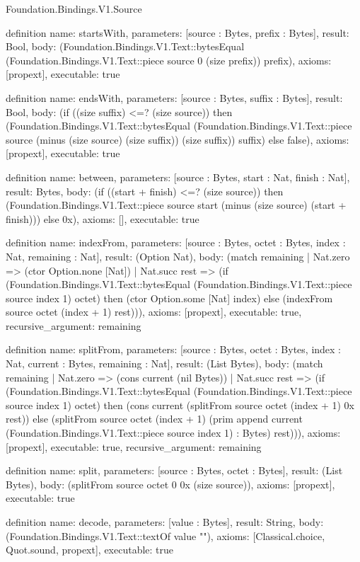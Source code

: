 \begin{lexlean}{Foundation.Bindings.V1.Source}
\begin{semanticmodule}
definition{
  name: startsWith,
  parameters: [source : Bytes, prefix : Bytes],
  result: Bool,
  body: (Foundation.Bindings.V1.Text::bytesEqual (Foundation.Bindings.V1.Text::piece source 0 (size prefix)) prefix),
  axioms: [propext],
  executable: true
}

definition{
  name: endsWith,
  parameters: [source : Bytes, suffix : Bytes],
  result: Bool,
  body: (if ((size suffix) <=? (size source)) then (Foundation.Bindings.V1.Text::bytesEqual (Foundation.Bindings.V1.Text::piece source (minus (size source) (size suffix)) (size suffix)) suffix) else false),
  axioms: [propext],
  executable: true
}

definition{
  name: between,
  parameters: [source : Bytes, start : Nat, finish : Nat],
  result: Bytes,
  body: (if ((start + finish) <=? (size source)) then (Foundation.Bindings.V1.Text::piece source start (minus (size source) (start + finish))) else 0x),
  axioms: [],
  executable: true
}

definition{
  name: indexFrom,
  parameters: [source : Bytes, octet : Bytes, index : Nat, remaining : Nat],
  result: (Option Nat),
  body: (match remaining
    | Nat.zero => (ctor Option.none [Nat])
    | Nat.succ rest => (if (Foundation.Bindings.V1.Text::bytesEqual (Foundation.Bindings.V1.Text::piece source index 1) octet) then (ctor Option.some [Nat] index) else (indexFrom source octet (index + 1) rest))),
  axioms: [propext],
  executable: true,
  recursive_argument: remaining
}

definition{
  name: splitFrom,
  parameters: [source : Bytes, octet : Bytes, index : Nat, current : Bytes, remaining : Nat],
  result: (List Bytes),
  body: (match remaining
    | Nat.zero => (cons current (nil Bytes))
    | Nat.succ rest => (if (Foundation.Bindings.V1.Text::bytesEqual (Foundation.Bindings.V1.Text::piece source index 1) octet) then (cons current (splitFrom source octet (index + 1) 0x rest)) else (splitFrom source octet (index + 1) (prim append current (Foundation.Bindings.V1.Text::piece source index 1) : Bytes) rest))),
  axioms: [propext],
  executable: true,
  recursive_argument: remaining
}

definition{
  name: split,
  parameters: [source : Bytes, octet : Bytes],
  result: (List Bytes),
  body: (splitFrom source octet 0 0x (size source)),
  axioms: [propext],
  executable: true
}

definition{
  name: decode,
  parameters: [value : Bytes],
  result: String,
  body: (Foundation.Bindings.V1.Text::textOf value ""),
  axioms: [Classical.choice, Quot.sound, propext],
  executable: true
}


\end{semanticmodule}
\end{lexlean}
